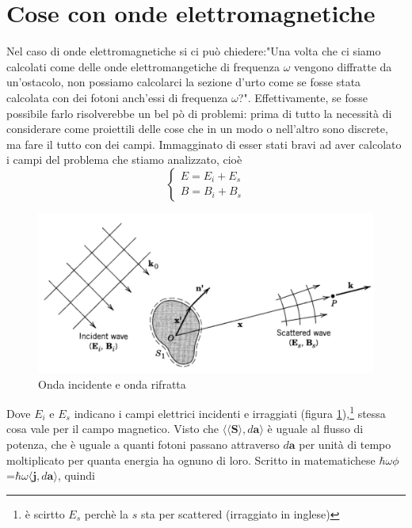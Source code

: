 \documentclass[11pt,a4paper]{report}
\newcommand{\vettore}[1]{\mathbf{#1}}
\newcommand{\pscal}[2]{\langle #1,#2\rangle}
\begin{document}
	\section{Cose con onde elettromagnetiche}
		Nel caso di onde elettromagnetiche si ci può chiedere:"Una volta che ci siamo calcolati come delle onde elettromangetiche di frequenza $\omega$ vengono diffratte da un'ostacolo, non possiamo calcolarci la sezione d'urto come se fosse stata calcolata con dei fotoni anch'essi di frequenza $\omega$?".\newline
		Effettivamente, se fosse possibile farlo risolverebbe un bel pò di problemi: prima di tutto la necessità di considerare come proiettili delle cose che in un modo o nell'altro sono discrete, ma fare il tutto con dei campi.\newline
		Immagginato di esser stati bravi ad aver calcolato i campi del problema che stiamo analizzato, cioè
		\[
			\begin{cases}
				E=E_{i}+E_{s}\\
				B=B_{i}+B_{s}

			\end{cases}
		\]
		\begin{figure}
			\centering
    		\includegraphics[width=\linewidth]{Immagini/irraggiamento.png}
    		\caption{Onda incidente e onda rifratta}
    		\label{fig:irr}
		\end{figure}
		Dove $E_{i}$ e $E_{s}$ indicano i campi elettrici incidenti e irraggiati (figura \ref{fig:irr}),\footnote{è scirtto $E_s$ perchè la $s$ sta per scattered (irraggiato in inglese)} stessa cosa vale per il campo magnetico.\newline
		Visto che $\pscal{\langle\vettore S \rangle}{d\vettore{a}}$ è uguale al flusso di potenza, che è uguale a quanti fotoni passano attraverso $d\vettore a$ per unità di tempo moltiplicato per quanta energia ha ognuno di loro. Scritto in matematichese $\hbar \omega \phi$=$\hbar \omega \pscal{\vettore j}{d\vettore a}$, quindi
\end{document}
